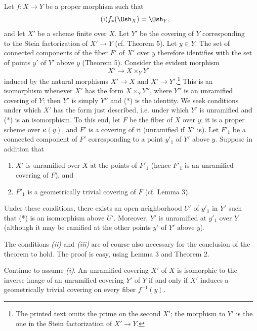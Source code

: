 Let $f:X\longrightarrow Y$ be a proper morphism such that
\begin{equation}
  \tag{i}
  f_*(\Osh_X)=\Osh_Y,
\end{equation}
and let $X'$ be a scheme finite over $X$. Let $Y'$ be the covering of $Y$
corresponding to the Stein factorization of $X'\longrightarrow Y$ (cf.
Theorem 5). Let $y\in Y$. The set of connected components of the fiber $F'$ of
$X'$ over $y$ therefore identifies with the set of points $y'$ of $Y'$ above
$y$ (Theorem 5). Consider the evident morphism
\begin{equation}
  \tag{*}
  X'\longrightarrow X\times_Y Y'
\end{equation}
induced by the natural morphisms $X'\longrightarrow X$ and
$X'\longrightarrow Y'$.\footnote{The printed text omits the prime on the
second $X'$; the morphism to $Y'$ is the one in the Stein factorization of
$X'\to Y$.} This is an isomorphism whenever $X'$ has the form
$X\times_Y Y''$, where $Y''$ is an unramified covering of $Y$; then $Y'$ is
simply $Y''$ and (*) is the identity. We seek conditions under which $X'$ has
the form just described, i.e. under which $Y'$ is unramified and (*) is an
isomorphism. To this end, let $F$ be the fiber of $X$ over $y$; it is a proper
scheme over $\kappa(y)$, and $F'$ is a covering of it (unramified if $X'$ is).
Let $F'_1$ be a connected component of $F'$ corresponding to a point $y'_1$
of $Y'$ above $y$. Suppose in addition that
\begin{enumerate}
  \item[\textit{(ii)}] $X'$ is unramified over $X$ at the points of $F'_1$
    (hence $F'_1$ is an unramified covering of $F$), and
  \item[\textit{(iii)}] $F'_1$ is a geometrically trivial covering of $F$
    (cf. Lemma 3).
\end{enumerate}

 Under these conditions, there exists an open neighborhood
$U'$ of $y'_1$ in $Y'$ such that (*) is an isomorphism above $U'$. Moreover,
$Y'$ is unramified at $y'_1$ over $Y$ (although it may be ramified at the other
points $y'$ of $Y'$ above $y$).

The conditions \textit{(ii)} and \textit{(iii)} are of course also necessary
for the conclusion of the theorem to hold. The proof is easy, using Lemma 3
and Theorem 2.

 Continue to assume \textit{(i)}. An unramified covering
$X'$ of $X$ is isomorphic to the inverse image of an unramified covering $Y'$
of $Y$ if and only if $X'$ induces a geometrically trivial covering on every
fiber $f^{-1}(y)$.

